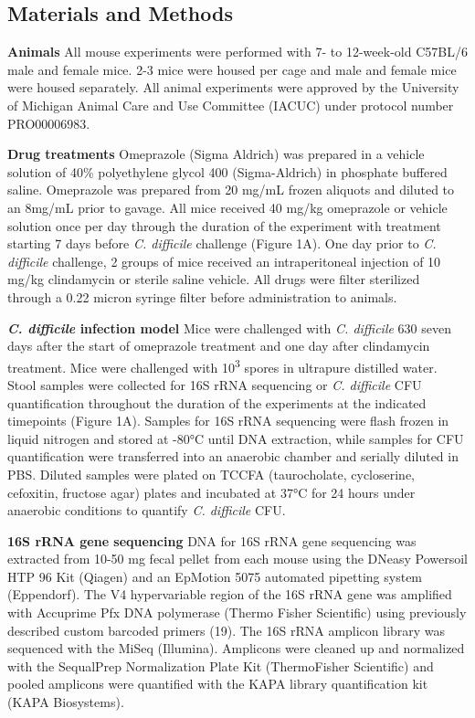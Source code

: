 \documentclass[11pt,]{article}
\begin{document}
\newpage

\subsection{Materials and Methods}\label{materials-and-methods}

\textbf{Animals} All mouse experiments were performed with 7- to
12-week-old C57BL/6 male and female mice. 2-3 mice were housed per cage
and male and female mice were housed separately. All animal experiments
were approved by the University of Michigan Animal Care and Use
Committee (IACUC) under protocol number PRO00006983.

\textbf{Drug treatments} Omeprazole (Sigma Aldrich) was prepared in a
vehicle solution of 40\% polyethylene glycol 400 (Sigma-Aldrich) in
phosphate buffered saline. Omeprazole was prepared from 20 mg/mL frozen
aliquots and diluted to an 8mg/mL prior to gavage. All mice received 40
mg/kg omeprazole or vehicle solution once per day through the duration
of the experiment with treatment starting 7 days before \emph{C.
difficile} challenge (Figure 1A). One day prior to \emph{C. difficile}
challenge, 2 groups of mice received an intraperitoneal injection of 10
mg/kg clindamycin or sterile saline vehicle. All drugs were filter
sterilized through a 0.22 micron syringe filter before administration to
animals.

\textbf{\emph{C. difficile} infection model} Mice were challenged with
\emph{C. difficile} 630 seven days after the start of omeprazole
treatment and one day after clindamycin treatment. Mice were challenged
with 10\textsuperscript{3} spores in ultrapure distilled water. Stool
samples were collected for 16S rRNA sequencing or \emph{C. difficile}
CFU quantification throughout the duration of the experiments at the
indicated timepoints (Figure 1A). Samples for 16S rRNA sequencing were
flash frozen in liquid nitrogen and stored at -80°C until DNA
extraction, while samples for CFU quantification were transferred into
an anaerobic chamber and serially diluted in PBS. Diluted samples were
plated on TCCFA (taurocholate, cycloserine, cefoxitin, fructose agar)
plates and incubated at 37°C for 24 hours under anaerobic conditions to
quantify \emph{C. difficile} CFU.

\textbf{16S rRNA gene sequencing} DNA for 16S rRNA gene sequencing was
extracted from 10-50 mg fecal pellet from each mouse using the DNeasy
Powersoil HTP 96 Kit (Qiagen) and an EpMotion 5075 automated pipetting
system (Eppendorf). The V4 hypervariable region of the 16S rRNA gene was
amplified with Accuprime Pfx DNA polymerase (Thermo Fisher Scientific)
using previously described custom barcoded primers (19). The 16S rRNA
amplicon library was sequenced with the MiSeq (Illumina). Amplicons were
cleaned up and normalized with the SequalPrep Normalization Plate Kit
(ThermoFisher Scientific) and pooled amplicons were quantified with the
KAPA library quantification kit (KAPA Biosystems).
\end{document}
